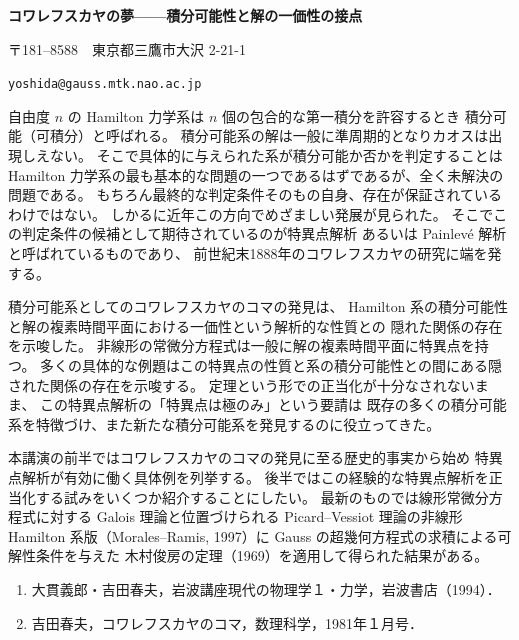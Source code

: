 \documentclass[uplatex,dvipdfmx]{jlreq}
\begin{document}
\bigskip\bigskip

\noindent
{\large\bfseries コワレフスカヤの夢——積分可能性と解の一価性の接点}

\medskip
\hspace*{\fill}{\large\bfseries 吉田 春夫（国立天文台）}

\medskip
\hspace*{\fill}〒181--8588　東京都三鷹市大沢 2-21-1

\medskip
\hspace*{\fill}\texttt{yoshida@gauss.mtk.nao.ac.jp}

\bigskip\bigskip

自由度 $n$ の Hamilton 力学系は $n$ 個の包合的な第一積分を許容するとき
積分可能（可積分）と呼ばれる。
積分可能系の解は一般に準周期的となりカオスは出現しえない。
そこで具体的に与えられた系が積分可能か否かを判定することは
Hamilton 力学系の最も基本的な問題の一つであるはずであるが、全く未解決の問題である。
もちろん最終的な判定条件そのもの自身、存在が保証されているわけではない。
しかるに近年この方向でめざましい発展が見られた。
そこでこの判定条件の候補として期待されているのが特異点解析
あるいは Painlevé 解析と呼ばれているものであり、
前世紀末1888年のコワレフスカヤの研究に端を発する。

積分可能系としてのコワレフスカヤのコマの発見は、
Hamilton 系の積分可能性と解の複素時間平面における一価性という解析的な性質との
隠れた関係の存在を示唆した。
非線形の常微分方程式は一般に解の複素時間平面に特異点を持つ。
多くの具体的な例題はこの特異点の性質と系の積分可能性との間にある隠された関係の存在を示唆する。
定理という形での正当化が十分なされないまま、
この特異点解析の「特異点は極のみ」という要請は
既存の多くの積分可能系を特徴づけ、また新たな積分可能系を発見するのに役立ってきた。

本講演の前半ではコワレフスカヤのコマの発見に至る歴史的事実から始め
特異点解析が有効に働く具体例を列挙する。
後半ではこの経験的な特異点解析を正当化する試みをいくつか紹介することにしたい。
最新のものでは線形常微分方程式に対する Galois 理論と位置づけられる
Picard--Vessiot 理論の非線形 Hamilton 系版（Morales--Ramis, 1997）に
Gauss の超幾何方程式の求積による可解性条件を与えた
木村俊房の定理（1969）を適用して得られた結果がある。

\bigskip


\begin{enumerate}
  \setlength{\itemsep}{2pt}
  \item 大貫義郎・吉田春夫，岩波講座現代の物理学１・力学，岩波書店（1994）．
  \item 吉田春夫，コワレフスカヤのコマ，数理科学，1981年１月号．
\end{enumerate}
\end{document}

